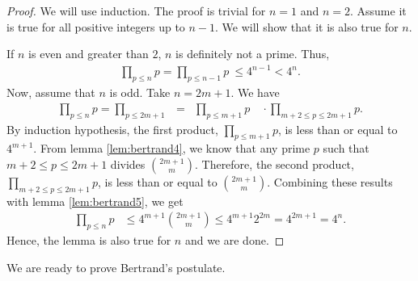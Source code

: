 \documentclass{subfile}
\begin{document}
	\begin{proof}
		We will use induction. The proof is trivial for $n=1$ and $n=2$. Assume it is true for all positive integers up to $n-1$. We will show that it is also true for $n$.
		
		If $n$ is even and greater than $2$, $n$ is definitely not a prime. Thus,
		\begin{align*}
			\prod_{p\leq n}p =  \prod_{p\leq n-1}p\ \leq  4^{n-1}<  4^n.
		\end{align*}
		Now, assume that $n$ is odd. Take $n=2m+1$. We have
		\begin{eqnarray*}
			\prod_{p\leq n}p =	\prod_{p\leq 2m+1}  & = & \prod_{p\leq m+1}p \quad \cdot \prod_{m+2\leq p\leq2m+1}p.
		\end{eqnarray*}
		By induction hypothesis, the first product, $\prod\limits_{p\leq m+1}p$, is less than or equal to $4^{m+1}$. From lemma \eqref{lem:bertrand4}, we know that any prime $p$ such that $m+2\leq p\leq2m+1$ divides $\binom{2m+1}{m}$. Therefore, the second product, $\prod\limits_{m+2\leq p\leq2m+1}p$, is less than or equal to $\binom{2m+1}{m}$. Combining these results with lemma \eqref{lem:bertrand5}, we get
		\begin{align*}
			\prod_{p\leq n}p &\leq 4^{m+1}\binom{2m+1}{m}\leq 4^{m+1}2^{2m} =  4^{2m+1} = 4^n.
		\end{align*}
		Hence, the lemma is also true for $n$ and we are done.
	\end{proof}
	
	We are ready to prove Bertrand's postulate.
	
\end{document}
